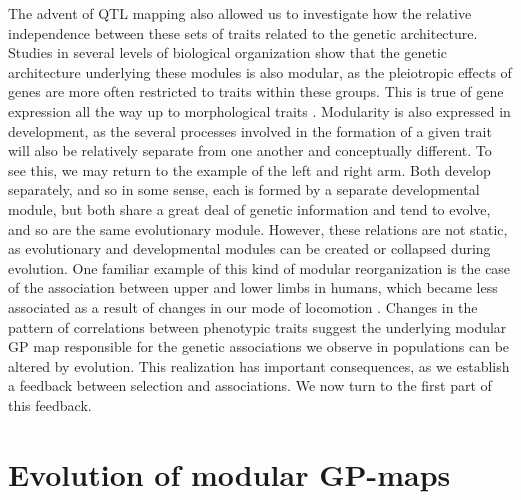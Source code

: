 \begin{refsection}
The advent of QTL mapping also allowed us to investigate how the
relative independence between these sets of traits related to the
genetic architecture. Studies in several levels of biological
organization show that the genetic architecture underlying these modules
is also modular, as the pleiotropic effects of genes are more often
restricted to traits within these groups. This is true of gene
expression \parencite{Hartwell1999-as, Segal2003-oq} all the way up to
morphological traits \parencite{Mezey2000-rs}. Modularity is also expressed
in development, as the several processes involved in the formation of a
given trait will also be relatively separate from one another and
conceptually different. To see this, we may return to the example of the
left and right arm. Both develop separately, and so in some sense, each
is formed by a separate developmental module, but both share a great
deal of genetic information and tend to evolve, and so are the same
evolutionary module. However, these relations are not static, as
evolutionary and developmental modules can be created or collapsed
during evolution. One familiar example of this kind of modular
reorganization is the case of the association between upper and lower
limbs in humans, which became less associated as a result of changes in
our mode of locomotion \parencite{Young2010-rm}. Changes in the pattern of
correlations between phenotypic traits suggest the underlying modular GP
map responsible for the genetic associations we observe in populations
can be altered by evolution. This realization has important
consequences, as we establish a feedback between selection and
associations. We now turn to the first part of this feedback.

\section{Evolution of modular GP-maps}


\end{refsection}
